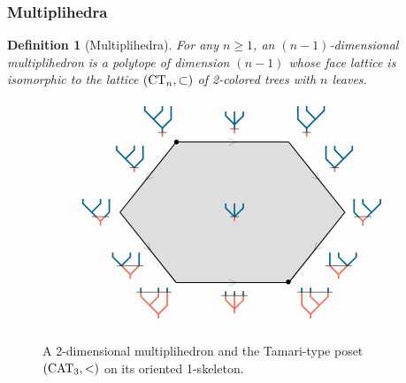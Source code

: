 \documentclass[10pt]{amsart}
\newtheorem{definition}{Definition}[section]
\theoremstyle{remark}
\begin{document}

\subsubsection{Multiplihedra} \label{sec:multiplihedra}

\begin{definition}[Multiplihedra]
For any $n\geq 1$, an \emph{$(n-1)$-dimensional multiplihedron} is a polytope of dimension $(n-1)$ whose face lattice is isomorphic to the lattice 
$(\mathrm{CT}_{n}, \subset)$
of 2-colored trees with $n$ leaves. 
\end{definition}

\begin{figure}[h]
\[
\begin{tikzpicture}[xscale=0.8,yscale=1]
\draw[fill, opacity=0.12] (-2,2)--(2,2)--(4,0)--(2,-2)--(-2,-2)--(-4,0)--cycle;
\draw (-2,2) node[above left] {$\TreeLa$};
\draw (2,2) node[above right] {$\TreeRa$};
\draw (-2,-2) node[below left] {$\TreeLc$};
\draw (2,-2) node[below right] {$\TreeRc$};
\draw (-4.2,0) node[left] {$\TreeLb$};
\draw (4,0) node[right] {$\TreeRb$};
\draw (-3,1) node[above left] {$\TreeLab$};
\draw (-3,-1) node[below left] {$\TreeLbc$};
\draw (3,1) node[above right] {$\TreeRab$};
\draw (3,-1) node[below right] {$\TreeRbc$};
\draw (0,2.1) node[above] {$\TreeCa$};
\draw (0,-2.1) node[below] {$\TreeCb$};
\draw (0,0) node  {$\TreeCab$};

\draw (-1.99,1.99) node  {$\bullet$};
\draw (1.99,-1.99) node  {$\bullet$};

\draw[thick] (-2,2)--(2,2) node[midway,sloped,allow upside down,scale=0.1]{\thickmidarrow};
\draw[thick] (2,2)--(4,0) node[midway,sloped,allow upside down,scale=0.1]{\thickmidarrow};
\draw[thick] (4,0)--(2,-2) node[midway,sloped,allow upside down,scale=0.1]{\thickmidarrow};

\draw[thick] (-2,2)--(-4,0) node[midway,sloped,allow upside down,scale=0.1]{\thickmidarrow};
\draw[thick] (-4,0)--(-2,-2) node[midway,sloped,allow upside down,scale=0.1]{\thickmidarrow};
\draw[thick] (-2,-2)--(2,-2) node[midway,sloped,allow upside down,scale=0.1]{\thickmidarrow};
\end{tikzpicture}
\]
\caption{A 2-dimensional multiplihedron and the Tamari-type poset $(\mathrm{CAT}_{3}, <)$ on its oriented 1-skeleton.}
\label{Fig4:J3}
\end{figure}
\end{document}

